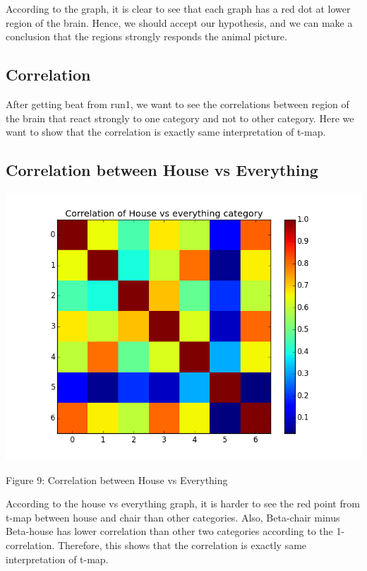 \documentclass[12pt]{article}
\begin{document}
\begin{housevseverything}
\begin{housevseverything}
\begin{housevseverything}
According to the graph, it is clear to see that each graph has a red dot at lower region of the brain. Hence, we should accept our hypothesis, and we can make a conclusion that the regions strongly responds the animal picture.
\end{housevseverything}

\subsection{Correlation}

After getting beat from run1, we want to see the correlations between  region of the brain that react strongly to one category and not to other category. Here we want to show that the correlation is exactly same interpretation  of t-map. 


\subsection{Correlation between House vs Everything}
\begin{housevseverything}
    \centering
      \includegraphics{corr_House_vs_everything}
    \caption{Figure 9: Correlation between House vs Everything}
\end{housevseverything}

According to the house vs everything graph, it is harder to see the red point from t-map between house and chair than other categories. Also, Beta-chair  minus Beta-house has lower correlation than other two categories according to the 1-correlation. Therefore,  this shows that the correlation is exactly same interpretation  of t-map. 


\end{housevseverything}
\end{housevseverything}
\end{document}
